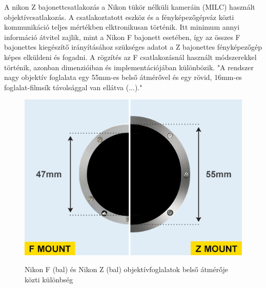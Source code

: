 A nikon Z bajonettcsatlakozás a Nikon tükör nélküli kameráin (MILC) használt objektívcsatlakozás. A csatlakoztatott eszköz és a fényképezőgépváz közti kommunikáció teljes mértékben elktronikusan történik. Itt minimum annyi információ átvitel zajlik, mint a Nikon F bajonett esetében, így az összes F bajonettes kiegészítő irányításához szükséges adatot a Z bajonettes fényképezőgép képes elküldeni és fogadni. A rögzítés az F csatlakozásnál használt módszerekkel történik, azonban dimenzióiban és implementációjában különbözik. "A rendszer nagy objektív foglalata egy 55mm-es belső átmérővel és egy rövid, 16mm-es foglalat-filmsík távolsággal van ellátva (...)."\cite{Nikon_Z}

\begin{figure}[H]
	\centering
	\includegraphics[width=0.5\linewidth]{img/F-mount-vs-Z-mount-illustration.jpg}
    \cite{Nikon_Z}
	\caption{Nikon F (bal) és Nikon Z (bal) objektívfoglalatok belső átmérője közti különbség}
	\label{fig:F_vs_Z_meret}
\end{figure}
